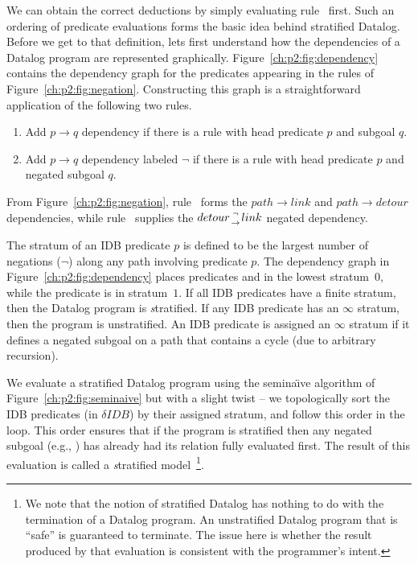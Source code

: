 We can obtain the correct deductions by simply evaluating rule~ first.
Such an ordering of predicate evaluations forms the basic idea behind
stratified Datalog.  Before we get to that definition, lets first understand
how the dependencies of a Datalog program are represented graphically.
Figure~\ref{ch:p2:fig:dependency} contains the dependency graph for the predicates
appearing in the rules of Figure~\ref{ch:p2:fig:negation}. Constructing this graph
is a straightforward application of the following two rules.
\begin{enumerate}
  \ssp
  \item Add $p \rightarrow q$ dependency if there is a rule with head predicate $p$ and subgoal $q$.
  \item Add $p \rightarrow q$ dependency labeled $\neg$ if there is a rule with head predicate $p$ and negated subgoal $q$.
\end{enumerate}
From Figure~\ref{ch:p2:fig:negation}, rule~ forms the $path \rightarrow
link$ and $path \rightarrow detour$ dependencies, while rule~ supplies the
$detour {\neg \atop \rightarrow} link$ negated dependency. 

The stratum of an IDB predicate $p$ is defined to be the largest number of
negations ($\neg$) along any path involving predicate $p$.  The dependency graph
in Figure~\ref{ch:p2:fig:dependency} places predicates  and
 in the lowest stratum~$0$, while the  predicate is in
stratum~$1$.  If all IDB predicates have a finite stratum, then the Datalog
program is {\emph stratified}.  If any IDB predicate has an $\infty$ stratum,
then the program is unstratified.  An IDB predicate is assigned an $\infty$
stratum if it defines a negated subgoal on a path that contains a cycle (due
to arbitrary recursion).

We evaluate a stratified Datalog program using the semina\"{\i}ve algorithm of
Figure~\ref{ch:p2:fig:seminaive} but with a slight twist -- we topologically
sort the IDB predicates (in $\delta IDB$) by their assigned stratum, and follow
this order in the loop.  This order ensures that if the program is stratified
then any negated subgoal (e.g., ) has already had its relation fully
evaluated first.  The result of this evaluation is called a {\emph stratified
model}~\footnote{We note that the notion of stratified Datalog has nothing to
do with the termination of a Datalog program.  An unstratified Datalog program
that is ``safe'' is guaranteed to terminate.  The issue here is whether the
result produced by that evaluation is consistent with the programmer's
intent.}.

